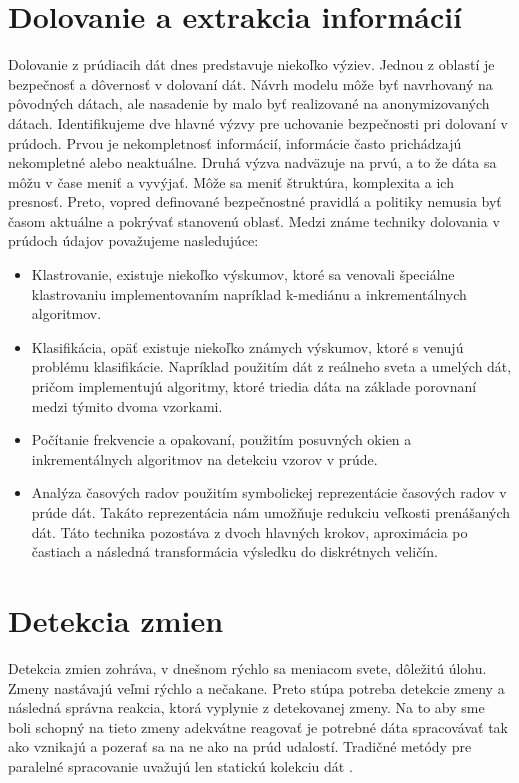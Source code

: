 \section{Dolovanie a extrakcia informácií} 
Dolovanie z prúdiacih dát dnes predstavuje niekoľko výziev. Jednou z oblastí je bezpečnosť a dôvernosť v dolovaní dát. Návrh modelu môže byť navrhovaný na pôvodných dátach, ale nasadenie by malo byť realizované na anonymizovaných dátach. Identifikujeme dve hlavné výzvy pre uchovanie bezpečnosti pri dolovaní v prúdoch. Prvou je nekompletnosť informácií, informácie často prichádzajú nekompletné alebo neaktuálne. Druhá výzva nadväzuje na prvú, a to že dáta sa môžu v čase meniť a vyvýjať. Môže sa meniť štruktúra, komplexita a ich presnosť. Preto, vopred definované bezpečnostné pravidlá a politiky nemusia byť časom aktuálne a pokrývať stanovenú oblasť. Medzi známe techniky dolovania v prúdoch údajov považujeme nasledujúce:
\\
\begin{itemize}
	\item Klastrovanie, existuje niekoľko výskumov, ktoré sa venovali špeciálne klastrovaniu implementovaním napríklad k-mediánu a inkrementálnych algoritmov.
	\item Klasifikácia, opäť existuje niekoľko známych výskumov, ktoré s venujú problému klasifikácie. Napríklad použitím dát z reálneho sveta a umelých dát, pričom implementujú algoritmy, ktoré triedia dáta na základe porovnaní medzi týmito dvoma vzorkami.
	\item Počítanie frekvencie a opakovaní, použitím posuvných okien a inkrementálnych algoritmov na detekciu vzorov v prúde.
	\item Analýza časových radov použitím symbolickej reprezentácie časových radov v prúde dát. Takáto reprezentácia nám umožňuje redukciu veľkosti prenášaných dát. Táto technika pozostáva z dvoch hlavných krokov, aproximácia po častiach a následná transformácia výsledku do diskrétnych veličín.
\end{itemize}

\emptysinglepage
\section{Detekcia zmien}
Detekcia zmien zohráva, v dnešnom rýchlo sa meniacom svete, dôležitú úlohu. Zmeny nastávajú veľmi rýchlo a nečakane. Preto stúpa potreba detekcie zmeny a následná správna reakcia, ktorá vyplynie z detekovanej zmeny. Na to aby sme boli schopný na tieto zmeny adekvátne reagovať je potrebné dáta spracovávať tak ako vznikajú a pozerať sa na ne ako na prúd udalostí. Tradičné metódy pre paralelné spracovanie uvažujú len statickú kolekciu dát \citep{tran2014change}.\\

